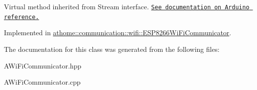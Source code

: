 Virtual method inherited from Stream interface. \href{https://www.arduino.cc/en/Serial/Write}{\tt See documentation on Arduino reference.} 

Implemented in \mbox{\hyperlink{classathome_1_1communication_1_1wifi_1_1_e_s_p8266_wi_fi_communicator_afd3c1c4ce7d68717a7bb2cf1b9dc962f}{athome\+::communication\+::wifi\+::\+E\+S\+P8266\+Wi\+Fi\+Communicator}}.



The documentation for this class was generated from the following files\+:\begin{DoxyCompactItemize}
\item 
A\+Wi\+Fi\+Communicator.\+hpp\item 
A\+Wi\+Fi\+Communicator.\+cpp\end{DoxyCompactItemize}
